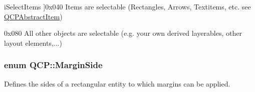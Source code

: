 \begin{Desc}
\begin{description}
{i\+Select\+Items\hypertarget{namespace_q_c_p_a2ad6bb6281c7c2d593d4277b44c2b037a271679ebb13ab4a6b4c2c2d9459f1de8}{}\label{namespace_q_c_p_a2ad6bb6281c7c2d593d4277b44c2b037a271679ebb13ab4a6b4c2c2d9459f1de8}
}]{\ttfamily 0x040} Items are selectable (Rectangles, Arrows, Textitems, etc. see \hyperlink{class_q_c_p_abstract_item}{Q\+C\+P\+Abstract\+Item}) \item[{\em 
i\+Select\+Other\hypertarget{namespace_q_c_p_a2ad6bb6281c7c2d593d4277b44c2b037a2ba96f62595bc22603da0e575b589a83}{}\label{namespace_q_c_p_a2ad6bb6281c7c2d593d4277b44c2b037a2ba96f62595bc22603da0e575b589a83}
}]{\ttfamily 0x080} All other objects are selectable (e.\+g. your own derived layerables, other layout elements,...) \end{description}
\end{Desc}
\subsubsection[{\texorpdfstring{Margin\+Side}{MarginSide}}]{\setlength{\rightskip}{0pt plus 5cm}enum {\bf Q\+C\+P\+::\+Margin\+Side}}\hypertarget{namespace_q_c_p_a7e487e3e2ccb62ab7771065bab7cae54}{}\label{namespace_q_c_p_a7e487e3e2ccb62ab7771065bab7cae54}
Defines the sides of a rectangular entity to which margins can be applied.

